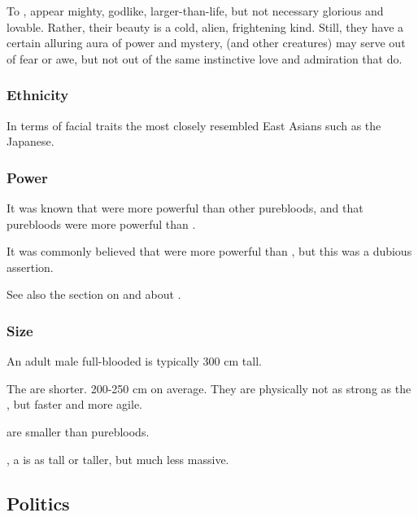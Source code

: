 To \nephilim, \resphain{} appear mighty, godlike, larger-than-life, but not necessary glorious and lovable. 
Rather, their beauty is a cold, alien, frightening kind. 
Still, they have a certain alluring aura of power and mystery, 
\Nephilim{} (and other creatures) may serve \resphain{} out of fear or awe, but not out of the same instinctive love and admiration that \humans{} do. 





\subsubsection{Ethnicity}
In terms of facial traits the \resphain{} most closely resembled East Asians such as the Japanese. 





\subsubsection{Power}
It was known that \satharioth were more powerful than other purebloods, and that purebloods were more powerful than \bezedeth. 

It was commonly believed that \ketherain were more powerful than \thelyadeth, but this was a dubious assertion.


See also the section on  and about .






\subsubsection{Size}
An adult male full-blooded \resphan{} is typically 300 cm tall. 

The \resviel{} are shorter. 
200-250 cm on average. 
They are physically not as strong as the \resphain, but faster and more agile. 

\Bezedeth{} are smaller than purebloods.

, a \resphan is as tall or taller, but much less massive. 








\subsection{Politics}





